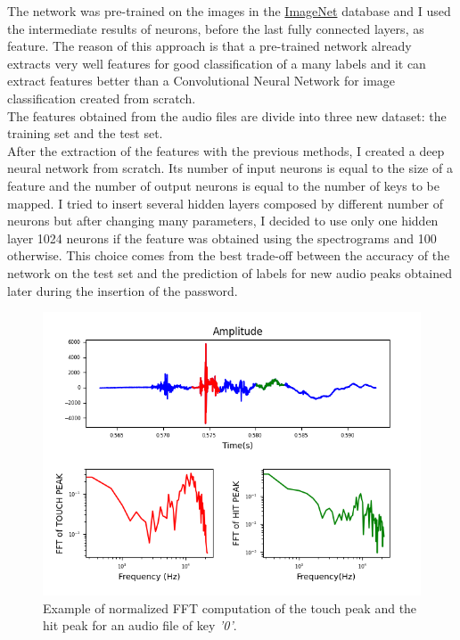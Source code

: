 The network was pre-trained on the images in the \href{http://www.image-net.org/}{ImageNet} database and I used the intermediate results of neurons, before the last fully connected layers, as feature. The reason of this approach is that a pre-trained network already extracts very well features for good classification of a many labels and it can extract features better than a Convolutional Neural Network for image classification created from scratch.\\
The features obtained from the audio files are divide into three new dataset: the training set and the test set. \\
After the extraction of the features with the previous methods, I created a deep neural network from scratch. Its number of input neurons is equal to the size of a feature and the number of output neurons is equal to the number of keys to be mapped. I tried to insert several hidden layers composed by different number of neurons but after changing many parameters, I decided to use only one hidden layer 1024 neurons if the feature was obtained using the spectrograms and 100 otherwise. This choice comes from the best trade-off between the accuracy of the network on the test set and the prediction of labels for new audio peaks obtained later during the insertion of the password.
\begin{figure}[H]
     \centering
     \includegraphics[width=.9\linewidth]{Images/AcCAPPCHA/feature_example}
     \caption{\footnotesize{Example of normalized FFT computation of the touch peak and the hit peak for an audio file of key \textit{'0'}.}}\label{AcCAPPCHA:feature_example}
\end{figure}
